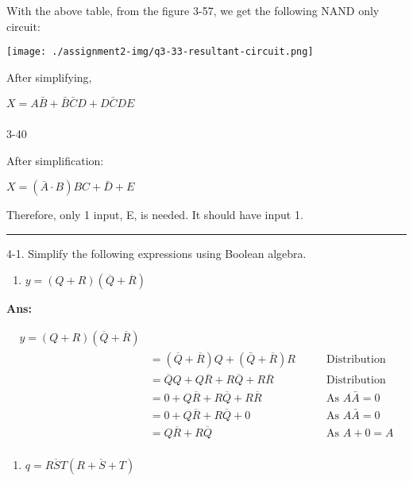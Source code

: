 \documentclass[
  a4paper,
]{article}
\makeatletter
\let\oldsubparagraph\subparagraph
\renewcommand{\subparagraph}{
    \@ifstar
      \xxxSubParagraphStar
      \xxxSubParagraphNoStar
  }
\newcommand{\xxxSubParagraphStar}[1]{\oldsubparagraph*{#1}\mbox{}}
\newcommand{\xxxSubParagraphNoStar}[1]{\oldsubparagraph{#1}\mbox{}}
\providecommand{\tightlist}{%
  \setlength{\itemsep}{0pt}\setlength{\parskip}{0pt}}
\makeatother
\begin{document}
With the above table, from the figure 3-57, we get the following NAND
only circuit:

\texttt{[image: ./assignment2-img/q3-33-resultant-circuit.png]}

After simplifying,

\(X = A\bar{B}+\bar{B}\bar{C}D +D\bar{C}DE\)

\newpage{}

\subparagraph{3-40}\label{section-2}

After simplification:

\(X = (\bar{A}\cdot B) BC +\bar{D}+E\)

Therefore, only 1 input, E, is needed. It should have input 1.

\begin{center}\rule{0.5\linewidth}{0.5pt}\end{center}

4-1. Simplify the following expressions using Boolean algebra.

\begin{enumerate}
\def\labelenumi{(\alph{enumi})}
\setcounter{enumi}{1}
\tightlist
\item
  \(y=(Q+R)(\overline{Q}+\overline{R})\)
\end{enumerate}

\textbf{Ans:}

\begin{align*}
  y=(Q+R)(\overline{Q}+\overline{R}) \\
  &= (\overline{Q}+\overline{R})Q+(\bar{Q}+\overline{R})R
    &\qquad \text{Distribution} \\
  &= \overline{Q}Q+Q\overline{R}+R\overline{Q}+{R}{\overline{R}}
    &\qquad \text{Distribution} \\
  &= 0+Q\overline{R}+R\overline{Q}+{R}{\overline{R}}
    &\qquad \text{As } A\bar{A} = 0 \\
  &= 0+Q\overline{R}+R\overline{Q}+0
    &\qquad \text{As } A\bar{A} = 0 \\
  &= \boxed{Q\overline{R}+R\overline{Q}}
    &\qquad \text{As } A+0 = A \\
\end{align*}

\begin{enumerate}
\def\labelenumi{(\alph{enumi})}
\setcounter{enumi}{3}
\tightlist
\item
  \(q=\overline{RST}(\overline{R+S+T})\)
\end{enumerate}
\end{document}
